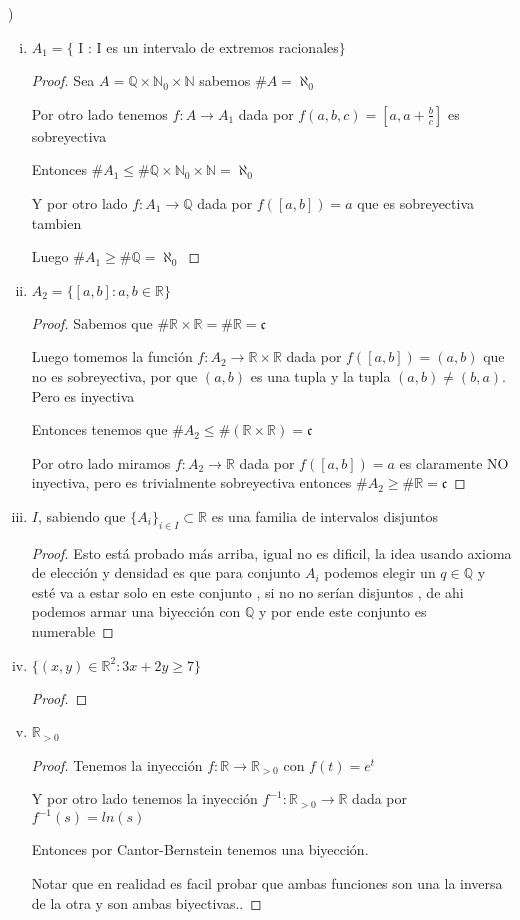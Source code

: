 \documentclass[12pt]{article}
\newcommand{\n}{\aleph_{0}}
\newcommand{\Q}{\mathbb{Q}}
\newcommand{\R}{\mathbb{R}}
\newcommand{\N}{\mathbb{N}}
\newcommand{\ra}{\rightarrow}
\theoremstyle{definition}
\begin{document}
) 
\begin{enumerate}[i.]
  \item $A_{1} = \{$ I : I es un intervalo de extremos racionales$ \}$
    \begin{proof}
      Sea $A = \Q \times \N_{0} \times \N $ sabemos $\# A = \n$ 

      Por otro lado tenemos $f: A \ra A_{1}$ dada por $f(a,b,c) =[a,a+ \frac{b}{c} ] $ es sobreyectiva

      Entonces $\# A_{1} \leq \# \Q \times \N_{0} \times \N = \n$

      Y por otro lado $f: A_{1} \ra \Q$ dada por $f([a,b]) = a$ que es sobreyectiva tambien 

      Luego $\# A_{1} \geq \# \Q = \n$
    \end{proof}
  \item $A_{2} = \{[a,b] : a,b \in \R \}$
    \begin{proof}
      Sabemos que $\# \R \times \R = \# \R = \mathfrak c$

      Luego tomemos la función $f : A_{2} \ra \R \times \R $ dada por $f([a,b]) =(a,b) $ que no es sobreyectiva, por que $(a,b)$ es una tupla y la tupla $(a,b)\neq (b,a)$. Pero es inyectiva

      Entonces tenemos que $\# A_{2} \leq \#( \R \times \R) = \mathfrak{c}$

      Por otro lado miramos $f : A_{2} \ra \R$ dada por $f([a,b]) = a$ es claramente NO inyectiva, pero es trivialmente sobreyectiva entonces $\# A_{2} \geq \# \R = \mathfrak{c}$
    \end{proof}
  \item $I$, sabiendo que $\{A_{i}\}_{i \in I} \subset \R$ es una familia de intervalos disjuntos
    \begin{proof}
      Esto está probado más arriba, igual no es dificil, la idea usando axioma de elección y densidad es que para conjunto $A_{i}$ podemos elegir un $q \in \Q$ y esté va a estar solo en este conjunto , si no no serían disjuntos , de ahi podemos armar una biyección con $\Q$ y por ende este conjunto es numerable 
    \end{proof}
  \item $\{(x,y) \in \R^{2} : 3x + 2y \geq 7\}$
    \begin{proof}
      
    \end{proof}
  \item $\R_{>0}$
    \begin{proof}
      Tenemos la inyección $f : \R \ra \R_{>0}$ con $f(t) = e^t$ 

      Y por otro lado tenemos la inyección $f^{-1} : \R_{>0} \ra \R$ dada por $f^{-1}(s) = ln(s)$

      Entonces por Cantor-Bernstein tenemos una biyección.

      Notar que en realidad es facil probar que ambas funciones son una la inversa de la otra y son ambas biyectivas..
    \end{proof}
\end{enumerate}
\end{document}
